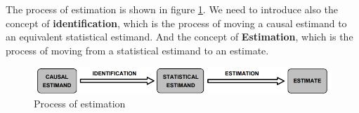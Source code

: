 The process of estimation is shown in figure \ref{fig:pipeline}. We need to
introduce also the concept of \textbf{identification}, which is the process of
moving a causal estimand to an equivalent statistical estimand. And the concept
of \textbf{Estimation}, which is the process of moving from a statistical estimand
to an estimate.
\begin{figure}[!ht]
    \centering
    \includegraphics[width=\textwidth]{img/process.png}
    \caption{Process of estimation}
    \label{fig:pipeline}
\end{figure}